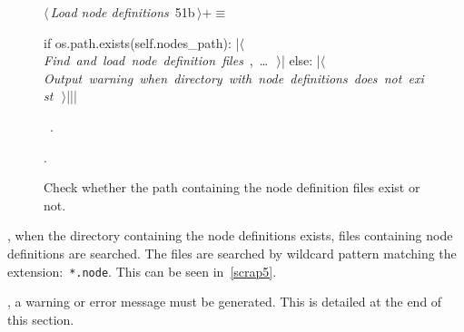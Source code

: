 \documentclass[%
    a4paper,    %
    justified,  %
    nobib,      %
    openany     %
]{tufte-book}
\makeatletter
\renewcommand{\label}[1]{\@tufte@label{##1}}%
\makeatother
\begin{document}
\begin{figure}[!htbp]
  \begin{flushleft} \small
\begin{minipage}{\linewidth}\label{scrap4}\raggedright\small
{} $\langle\,${\itshape Load node definitions}\nobreak\ {\footnotesize {51b}}$\,\rangle+\equiv$
\vspace{-1ex}
\begin{pythoncode}
if os.path.exists(self.nodes_path):
    |\hbox{$\langle\,${\itshape Find and load node definition files}\nobreak\ {\footnotesize {}, \ldots\ }$\,\rangle$}|
else:
    |\hbox{$\langle\,${\itshape Output warning when directory with node definitions does not exist}\nobreak\ {\footnotesize {}}$\,\rangle$}||\NWsep|
\end{pythoncode}
\vspace{1.5ex}
\footnotesize
\begin{list}{}{\setlength{\itemsep}{-\parsep}\setlength{\itemindent}{-\leftmargin}}
\item \NWtxtMacroDefBy\ .
\item {\NWtxtMacroNoRef}.

\item{}
\end{list}
\end{minipage}\vspace{4ex}
\end{flushleft}
\caption{Check whether the path containing the node definition files exist or
    not.}
\end{figure}

, when the directory containing the node
definitions exists, files containing node definitions are searched. The files
are searched by wildcard pattern matching the extension:~\verb|*.node|. This can
be seen in~\cref{scrap5}.

, a warning or error message must be generated.
This is detailed at the end of this section.
\end{document}

